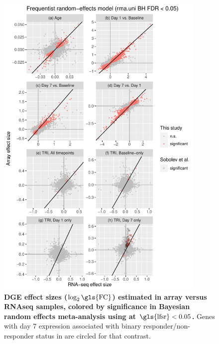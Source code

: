 \begin{figure}
    \includegraphics[width=0.9\textwidth,page=2]{mainmatter/figures/chapter_02/plot_dge_eqtl.DGE.effectSizeComparison.pdf}
    \caption{
        \textbf{\gls{DGE} effect sizes ($\log_2\text{\gls{FC}}$) estimated in array versus \gls{RNAseq} samples, colored by significance in Bayesian random effects meta-analysis using  at  $\text{\gls{lfsr}} < 0.05$.}
    Genes with day 7 expression associated with binary responder/non-responder status in \textcite{sobolev2016AdjuvantedInfluenzaH1N1Vaccination} are circled for that contrast.
    }
    \label{fig:hird_DGE_effectSizeComparisons_bayesmeta}
\end{figure}

